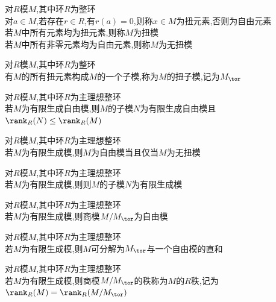 \begin{dingyi}
对$R$模$M$,其中环$R$为整环\\
对$a\in M$,若存在$r\in R$,有$r(a)=0$,则称$x\in M$为扭元素,否则为自由元素\\
若$M$中所有元素均为扭元素,则称$M$为扭模\\
若$M$中所有非零元素均为自由元素,则称$M$为无扭模
\end{dingyi}

\begin{tuilun}
对$R$模$M$,其中环$R$为整环\\
有$M$的所有扭元素构成$M$的一个子模,称为$M$的扭子模,记为$M_{\tor}$
\end{tuilun}

\begin{dingli}
对$R$模$M$,其中环$R$为主理想整环\\
若$M$为有限生成自由模,则$M$的子模$N$为有限生成自由模且$\rank_{R}(N)\leq \rank_{R}(M)$
\end{dingli}

\begin{dingli}
对$R$模$M$,其中环$R$为主理想整环\\
若$M$为有限生成模,则$M$为自由模当且仅当$M$为无扭模
\end{dingli}

\begin{dingli}
对$R$模$M$,其中环$R$为主理想整环\\
若$M$为有限生成模,则则$M$的子模$N$为有限生成模
\end{dingli}

\begin{dingli}
对$R$模$M$,其中环$R$为主理想整环\\
若$M$为有限生成模,则商模$M/M_{\tor}$为自由模
\end{dingli}

\begin{dingli}
对$R$模$M$,其中环$R$为主理想整环\\
若$M$为有限生成模,则$M$可分解为$M_{\tor}$与一个自由模的直和
\end{dingli}

\begin{dingyi}
对$R$模$M$,其中环$R$为主理想整环\\
若$M$为有限生成模,则商模$M/M_{\tor}$的秩称为$M$的$R$秩,记为$\rank_{R}(M)=\rank_{R}(M/M_{\tor})$
\end{dingyi}

